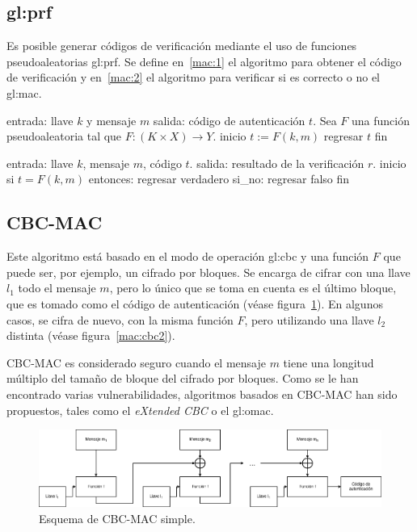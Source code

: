 \subsection{\texorpdfstring{\acrlong{gl:prf}}{Función pseudoaleatoria}}
Es posible generar códigos de verificación mediante el uso de funciones
pseudoaleatorias \gls{gl:prf}. Se define en~\ref{mac:1} el algoritmo para
obtener el código de verificación y en~\ref{mac:2} el algoritmo para verificar
si es correcto o no el \gls{gl:mac}.

\begin{pseudocodigo}[caption={\gls{gl:mac} mediante \gls{gl:prf}, obtener código.},
  label={mac:1}]
    entrada:    llave $k$ y mensaje $m$
    salida:     código de autenticación $t$.
    Sea $F$ una función pseudoaleatoria tal que $F:(K \times X) \rightarrow Y$.
    inicio
      $t := F(k,m)$
      regresar $t$
    fin
\end{pseudocodigo}

\begin{pseudocodigo}[caption={\gls{gl:mac} mediante \gls{gl:prf}, verificar código.},
  label={mac:2}]
    entrada:    llave $k$, mensaje $m$, código $t$.
    salida:     resultado de la verificación $r$.
    inicio
      si $t = F(k,m)$ entonces:
        regresar verdadero
      si_no:
        regresar falso
    fin
\end{pseudocodigo}

\subsection{CBC-MAC}
Este algoritmo está basado en el modo de operación \gls{gl:cbc} y una función
$F$ que puede ser, por ejemplo, un cifrado por bloques. Se encarga de
cifrar con una llave $l_1$ todo el mensaje $m$, pero lo único que se toma en
cuenta es el último bloque, que es tomado como el código de autenticación
(véase figura~\ref{mac:cbc1}). En algunos casos, se cifra de nuevo, con la misma
función $F$, pero utilizando una llave $l_2$ distinta (véase
figura~\ref{mac:cbc2}).

CBC-MAC es considerado seguro cuando el mensaje $m$ tiene una longitud
múltiplo del tamaño de bloque del cifrado por bloques. Como se le han
encontrado varias vulnerabilidades, algoritmos basados en CBC-MAC han sido
propuestos, tales como el \textit{eXtended CBC} o el \gls{gl:omac}.

\begin{figure}
  \begin{center}
    \includegraphics[width=0.9\linewidth]{diagramas/cbcmac.png}
    \caption{Esquema de CBC-MAC simple.}
    \label{mac:cbc1}
  \end{center}
\end{figure}

